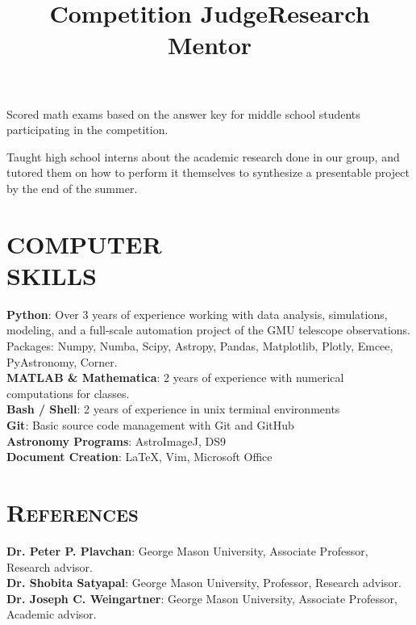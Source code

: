 \documentclass[marg, centered]{res}
\begin{document}
\begin{resume}
\title{\textbf{Competition Judge}}
\begin{position}
Scored math exams based on the answer key for middle school students participating in the competition.
\end{position}

\vspace{-0.3cm}
\title{\textbf{Research Mentor}}
\begin{position}
Taught high school interns about the academic research done in our group, and tutored them on how to perform it themselves to synthesize a presentable project by the end of the summer.
\end{position}


\section{COMPUTER\\SKILLS}

\textbf{Python}: Over 3 years of experience working with data analysis, simulations, modeling, and a full-scale automation project of the GMU telescope observations. Packages: Numpy, Numba, Scipy, Astropy, Pandas, Matplotlib, Plotly, Emcee, PyAstronomy, Corner. \\
\textbf{MATLAB \& Mathematica}: 2 years of experience with numerical computations for classes. \\
\textbf{Bash / Shell}{: 2 years of experience in unix terminal environments} \\
\textbf{Git}{: Basic source code management with Git and GitHub} \\
\textbf{Astronomy Programs}{: AstroImageJ, DS9} \\
\textbf{Document Creation}{: \LaTeX, Vim, Microsoft Office} \\


\section{{\scshape \bfseries References}}
\textbf{Dr. Peter P. Plavchan}{: George Mason University, Associate Professor, Research advisor.}\\
\textbf{Dr. Shobita Satyapal}{: George Mason University, Professor, Research advisor.}\\
\textbf{Dr. Joseph C. Weingartner}{: George Mason University,  Associate Professor, Academic advisor.}\\

\end{resume}
\end{document}
